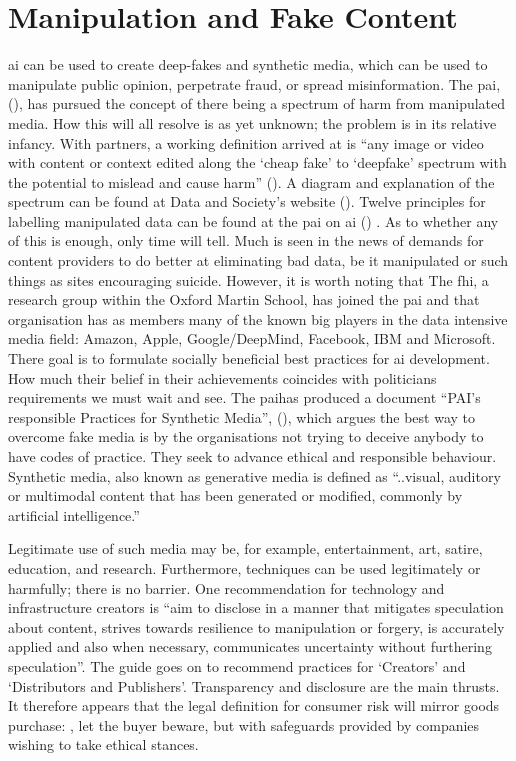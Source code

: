\section{Manipulation and Fake Content}
\Gls{ai} can be used to create deep-fakes and synthetic media, which can be used to manipulate public opinion, perpetrate fraud, or spread misinformation. The \gls{pai}, (\cite{citation:partnershiponai}),  has pursued the concept of there being a spectrum of harm from manipulated media. How this will all resolve is as yet unknown; the problem is in its relative infancy. With partners, a working definition arrived at is ``any image or video with content or context edited along the `cheap fake' to `deepfake' spectrum with the potential to mislead and cause harm'' (\cite{citation:deepfakes}). A diagram and explanation of the spectrum can be found at Data and Society’s website (\cite{citation:deepfakesspectrum}). Twelve principles for labelling manipulated data can be found at the \gls{pai} on \gls{ai} (\cite{citation:twelveprinciples}) . As to whether any of this is enough, only time will tell. Much is seen in the news of demands for content providers to do better at eliminating bad data, be it manipulated or such things as sites encouraging suicide. However, it is worth noting that The \gls{fhi}, a research group within the Oxford Martin School, has joined the \gls{pai} and that organisation has as members many of the known big players in the data intensive media field: Amazon, Apple, Google/DeepMind, Facebook, IBM and Microsoft. There goal is to formulate socially beneficial best practices for \gls{ai} development. How much their belief in their achievements coincides with politicians requirements we must wait and see. The \gls{pai}has produced a document ``PAI’s responsible Practices for Synthetic Media'', (\cite{citation:pais}), which argues the best way to overcome fake media is by the organisations not trying to deceive anybody to have codes of practice. They seek to advance ethical and responsible behaviour. Synthetic media, also known as generative media is defined as ``..visual, auditory or multimodal content that has been generated or modified, commonly by artificial intelligence.''

Legitimate use of such media may be, for example, entertainment, art, satire, education, and research. Furthermore, techniques can be used legitimately or harmfully; there is no barrier. One recommendation for technology and infrastructure creators is ``aim to disclose in a manner that mitigates speculation about content, strives towards resilience to manipulation or forgery, is accurately applied and also when necessary, communicates uncertainty without furthering speculation''. The guide goes on to recommend practices for `Creators' and `Distributors and Publishers'. Transparency and disclosure are the main thrusts. It therefore appears that the legal definition for consumer risk will mirror goods purchase: , let the buyer beware, but with safeguards provided by companies wishing to take ethical stances.

